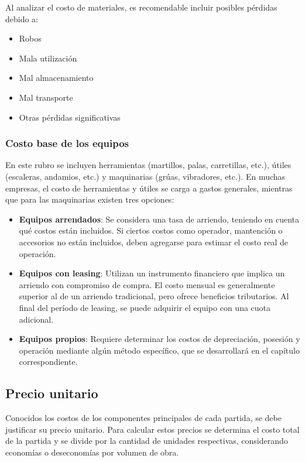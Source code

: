 Al analizar el costo de materiales, es recomendable incluir posibles pérdidas debido a:

\begin{itemize}
    \item Robos
    \item Mala utilización
    \item Mal almacenamiento
    \item Mal transporte
    \item Otras pérdidas significativas
\end{itemize}

\subsubsection{Costo base de los equipos}

En este rubro se incluyen herramientas (martillos, palas, carretillas, etc.), útiles (escaleras, andamios, etc.) y maquinarias (grúas, vibradores, etc.). En muchas empresas, el costo de herramientas y útiles se carga a gastos generales, mientras que para las maquinarias existen tres opciones:

\begin{itemize}
    \item \textbf{Equipos arrendados}: Se considera una tasa de arriendo, teniendo en cuenta qué costos están incluidos. Si ciertos costos como operador, mantención o accesorios no están incluidos, deben agregarse para estimar el costo real de operación.
    
    \item \textbf{Equipos con leasing}: Utilizan un instrumento financiero que implica un arriendo con compromiso de compra. El costo mensual es generalmente superior al de un arriendo tradicional, pero ofrece beneficios tributarios. Al final del período de leasing, se puede adquirir el equipo con una cuota adicional.
    
    \item \textbf{Equipos propios}: Requiere determinar los costos de depreciación, posesión y operación mediante algún método específico, que se desarrollará en el capítulo correspondiente.
\end{itemize}

\subsection{Precio unitario}

Conocidos los costos de los componentes principales de cada partida, se debe justificar su precio unitario. Para calcular estos precios se determina el costo total de la partida y se divide por la cantidad de unidades respectivas, considerando economías o deseconomías por volumen de obra.

